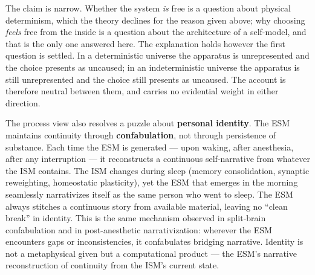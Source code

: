 \documentclass[12pt]{article}
\begin{document}
The claim is narrow. Whether the system \emph{is} free is a question about physical determinism, which the theory declines for the reason given above; why choosing \emph{feels} free from the inside is a question about the architecture of a self-model, and that is the only one answered here. The explanation holds however the first question is settled. In a deterministic universe the apparatus is unrepresented and the choice presents as uncaused; in an indeterministic universe the apparatus is still unrepresented and the choice still presents as uncaused. The account is therefore neutral between them, and carries no evidential weight in either direction.

The process view also resolves a puzzle about \textbf{personal identity}. The ESM maintains continuity through \textbf{confabulation}, not through persistence of substance. Each time the ESM is generated --- upon waking, after anesthesia, after any interruption --- it reconstructs a continuous self-narrative from whatever the ISM contains. The ISM changes during sleep (memory consolidation, synaptic reweighting, homeostatic plasticity), yet the ESM that emerges in the morning seamlessly narrativizes itself as the same person who went to sleep. The ESM always stitches a continuous story from available material, leaving no ``clean break'' in identity. This is the same mechanism observed in split-brain confabulation \citep{Gazzaniga2000} and in post-anesthetic narrativization: wherever the ESM encounters gaps or inconsistencies, it confabulates bridging narrative. Identity is not a metaphysical given but a computational product --- the ESM's narrative reconstruction of continuity from the ISM's current state.
\end{document}
